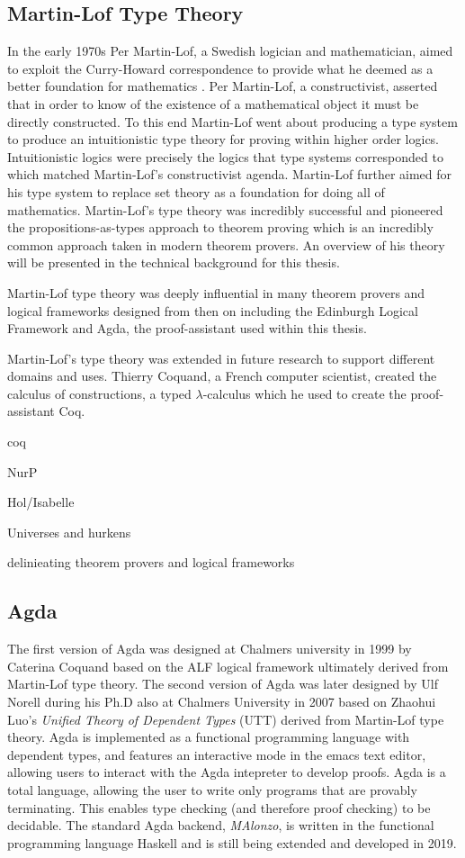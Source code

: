 \subsection{Martin-Lof Type Theory}
In the early 1970s Per Martin-Lof, a Swedish logician and mathematician, aimed
to exploit the Curry-Howard correspondence to provide what he deemed as a better
foundation for mathematics \cite{martin1984intuitionistic}. Per Martin-Lof, a constructivist, asserted that in
order to know of the existence of a mathematical object it must be directly
constructed. To this end Martin-Lof went about producing a type system to
produce an intuitionistic type theory for proving within higher order logics.
Intuitionistic logics were precisely the logics that type systems corresponded
to which matched Martin-Lof's constructivist agenda. Martin-Lof further aimed
for his type system to replace set theory as a foundation for doing all of
mathematics. Martin-Lof's type theory was incredibly successful and pioneered
the propositions-as-types approach to theorem proving which is an incredibly
common approach taken in modern theorem provers. An overview of his theory will
be presented in the technical background for this thesis.

Martin-Lof type theory was deeply influential in many theorem provers and
logical frameworks designed from then on including the Edinburgh Logical
Framework and  Agda, the proof-assistant used within this thesis.

Martin-Lof's type theory was extended in future research to support different
domains and uses. Thierry Coquand, a French computer scientist, created the
calculus of constructions, a typed $\lambda$-calculus which he used to create
the proof-assistant Coq.

coq

NurP

Hol/Isabelle

Universes and hurkens

delinieating theorem provers and logical frameworks

\subsection{Agda}
The first version of Agda was designed at Chalmers university in 1999 by
Caterina Coquand based on the ALF logical framework ultimately derived from
Martin-Lof type theory. The second version of Agda was later designed by Ulf
Norell during his Ph.D also at Chalmers University in 2007 based on Zhaohui Luo's
\textit{Unified Theory of Dependent Types} (UTT) derived from Martin-Lof type
theory. Agda is implemented as a functional programming language with dependent
types, and features an interactive mode in the emacs text editor, allowing users
to interact with the Agda intepreter to develop proofs. Agda is a total
language, allowing the user to write only programs that are provably
terminating. This enables type checking (and therefore proof checking) to be
decidable. The standard Agda backend, \textit{MAlonzo}, is written in the
functional programming language Haskell and is still being extended and
developed in 2019.
